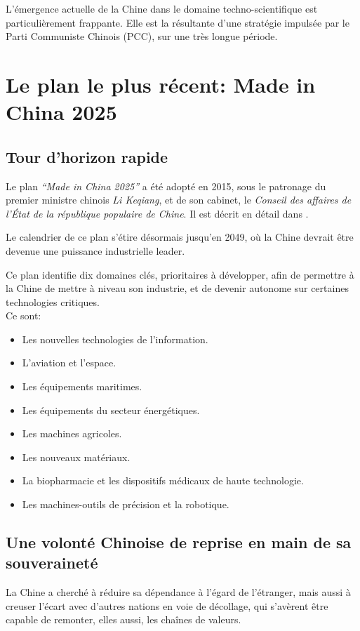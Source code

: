 \documentclass[a4paper]{article}
\author{Georges}
\date{\today}
\title{}
\begin{document}
\tableofcontents

L’émergence actuelle de la Chine dans le domaine techno-scientifique est
particulièrement frappante. Elle est la résultante d’une stratégie impulsée par
le Parti Communiste Chinois (PCC), sur une très longue période.
\section{Le plan le plus récent: Made in China 2025}
\label{sec:org5915e2c}
\subsection{Tour d’horizon rapide}
\label{sec:org35ecd62}
Le plan \emph{“Made in China 2025”} a été adopté en 2015, sous le patronage du
premier ministre chinois \emph{Li Keqiang}, et de son cabinet, le \emph{Conseil des
affaires de l'État de la république populaire de Chine}. Il est décrit en détail dans
\cite{Made_In_China_2025}. 

Le calendrier de ce plan s’étire désormais jusqu’en 2049, où la Chine devrait
être devenue une puissance industrielle leader. \cite{Evolving_MiC25} 

Ce plan identifie dix domaines clés, prioritaires à développer, afin de
permettre à la Chine de mettre à niveau son industrie, et de devenir autonome
sur certaines technologies critiques.\\

Ce sont:
\begin{itemize}
\item Les nouvelles technologies de l’information.
\item L’aviation et l’espace.
\item Les équipements maritimes.
\item Les équipements du secteur énergétiques.
\item Les machines agricoles.
\item Les nouveaux matériaux.
\item La biopharmacie et les dispositifs médicaux de haute technologie.
\item Les machines-outils de précision et la robotique.
\end{itemize}

\subsection{Une volonté Chinoise de reprise en main de sa souveraineté}
\label{sec:orgf222c4b}
La Chine a cherché à réduire sa dépendance à l’égard de l’étranger, mais aussi à
creuser l’écart avec d’autres nations en voie de décollage, qui s’avèrent être
capable de remonter, elles aussi, les chaînes de valeurs.
\end{document}
